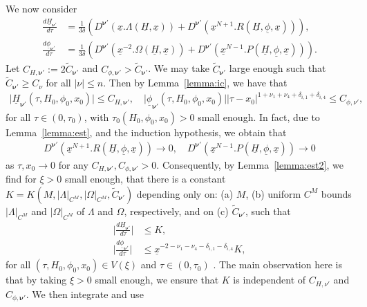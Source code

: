 \documentclass[reqno,12pt]{amsart}
\newcommand{\eqlab}[1]{\label{eq:#1}}
\newcommand{\lemmaref}[1]{Lemma~\ref{lemma:#1}}
\numberwithin{equation}{section}
\begin{document}
We now consider 
\begin{align*}
 \frac{d \underline H_{\mathbf \nu'}}{d\tau} &=\frac{1}{3\delta}\left( D^{\mathbf \nu'} (\underline x. \Lambda(\underline H,\underline x))+D^{\mathbf \nu'} (\underline x^{N+1} .R(\underline H,\underline \phi,\underline  x))\right),\\
 \frac{d \underline \phi_{\mathbf \nu'}}{d\tau} &=\frac{1}{3\delta}\left( D^{\mathbf \nu'} (\underline x^{-2} .\Omega(\underline H,\underline x))+D^{\mathbf \nu'} (\underline x^{N-1} .P(\underline H,\underline \phi,\underline  x))\right).
\end{align*}
Let $C_{H,\mathbf \nu'}:=2\widetilde  C_{\mathbf \nu'}$ and $C_{\phi,\mathbf \nu'}>\widetilde  C_{\mathbf \nu'}$. We may take $\widetilde  C_{\mathbf \nu'}$ large enough such that $\widetilde  C_{\mathbf \nu'}\ge C_{\nu}$ for all $\vert \nu\vert\le n$. Then by \lemmaref{ic}, we have that
 \begin{align}
 \vert \underline H_{\mathbf\nu'}(\tau,H_0,\phi_0,x_0)\vert \le C_{H,\mathbf \nu'},\quad \vert \underline \phi_{\mathbf\nu'}(\tau,H_0,\phi_0,x_0)\vert\vert \tau-x_0\vert^{1+\nu_1+\nu_4+\delta_{i,1}+\delta_{i,4}}\le C_{\phi,\nu'},\eqlab{estfinal}
\end{align}
for all $\tau\in (0,\tau_0)$, with $\tau_0(H_0,\phi_0,x_0)>0$ small enough. In fact, due to \lemmaref{est}, and the induction hypothesis, we obtain that
\begin{align*}
D^{\mathbf \nu'} (\underline x^{N+1} .R(\underline H,\underline \phi,\underline  x))\rightarrow 0,\quad
D^{\mathbf \nu'} (\underline x^{N-1} .P(\underline H,\underline \phi,\underline  x))\rightarrow 0
\end{align*}
as $\tau,x_0\rightarrow 0$ for any $C_{H,\mathbf \nu'}, C_{\phi,\mathbf \nu'}>0$. Consequently, by \lemmaref{est2}, we find for $\xi>0$ small enough, that there is a constant $K=K(M,\vert \Lambda\vert_{C^M},\vert \Omega\vert_{C^M}, \widetilde C_{\mathbf \nu'})$ depending only on: (a) $M$, (b) uniform $C^M$ bounds $\vert \Lambda\vert_{C^M}$ and $\vert \Omega\vert_{C^M}$ of $\Lambda$ and $\Omega$, respectively, and on (c) $\widetilde C_{\mathbf \nu'}$, such that 
\begin{align*}
\big \vert \frac{d \underline H_{\mathbf \nu'}}{d\tau}\big \vert &\le K,\\
 \big \vert \frac{d \underline \phi_{\mathbf \nu'}}{d\tau}\big\vert &\le \underline x^{-2-\nu_1-\nu_4-\delta_{i,1}-\delta_{i,4}} K,
\end{align*}
for all $(\tau,H_0,\phi_0,x_0)\in V(\xi)$ and $\tau\in (0,\tau_0)$ . The main observation here is that by taking $\xi>0$ small enough, we ensure that $K$ is independent of $C_{H,\nu'}$ and $C_{\phi,\mathbf \nu'}$. We then integrate and use 
\end{document}
